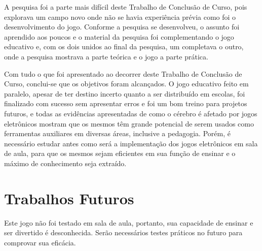  A pesquisa foi a parte mais difícil deste Trabalho de Conclusão de Curso, pois explorava um campo novo onde não se havia experiência prévia como foi o desenvolvimento do jogo. Conforme a pesquisa se desenvolveu, o assunto foi aprendido aos poucos e o material da pesquisa foi complementando o jogo educativo e, com os dois unidos ao final da pesquisa, um completava o outro, onde a pesquisa mostrava a parte teórica e o jogo a parte prática.
 
 Com tudo o que foi apresentado ao decorrer deste Trabalho de Conclusão de Curso, conclui-se que os objetivos foram alcançados. O jogo educativo feito em paralelo, apesar de ter destino incerto quanto a ser distribuído em escolas, foi finalizado com sucesso sem apresentar erros e foi um bom treino para projetos futuros, e todas as evidências apresentadas de como o cérebro é afetado por jogos eletrônicos mostram que os mesmos têm grande potencial de serem usados como ferramentas auxiliares em diversas áreas, inclusive a pedagogia. Porém, é necessário estudar antes como será a implementação dos jogos eletrônicos em sala de aula, para que os mesmos sejam eficientes em sua função de ensinar e o máximo de conhecimento seja extraído.
 
  \section{Trabalhos Futuros}
  
  Este jogo não foi testado em sala de aula, portanto, sua capacidade de ensinar e ser divertido é desconhecida. Serão necessários testes práticos no futuro para comprovar sua eficácia.